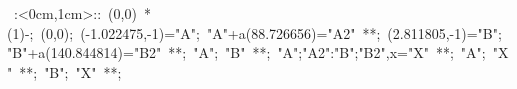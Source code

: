 %


\hbox{
\xy    <1cm,0cm>:<0cm,1cm>::
       (0,0) *\ellipse(1){-}; (0,0); 
       (-1.022475,-1)="A"; "A"+a(88.726656)="A2" **\dir{-}; 
       (2.811805,-1)="B"; "B"+a(140.844814)="B2" **\dir{-}; 
       "A"; "B" **\dir{-}; 
       {"A";"A2":"B";"B2",x}="X" **\dir{-}; 
       "A"; "X" **\dir{-}; 
       "B"; "X" **\dir{-}; 
\endxy}


